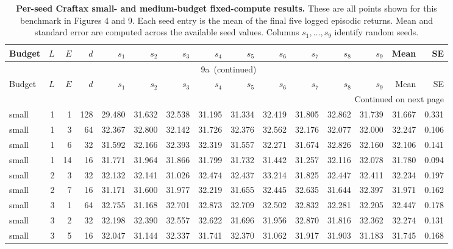 {\scriptsize
\setlength{\tabcolsep}{1.2pt}
\renewcommand{\thetable}{9a}
\begin{longtable}{@{}lrrrrrrrrrrrrrr@{}}
\caption{\textbf{Per-seed Craftax small- and medium-budget fixed-compute results.} These are all points shown for this benchmark in Figures 4 and 9. Each seed entry is the mean of the final five logged episodic returns. Mean and standard error are computed across the available seed values. Columns \(s_1,\ldots,s_9\) identify random seeds.}\label{tab:appendix-craftax-fixed-compute-seeds}\\
\toprule
Budget & \(L\) & \(E\) & \(d\) & \(s_1\) & \(s_2\) & \(s_3\) & \(s_4\) & \(s_5\) & \(s_6\) & \(s_7\) & \(s_8\) & \(s_9\) & Mean & SE \\
\midrule
\endfirsthead
\multicolumn{15}{c}{\tablename~\thetable\ (continued)} \\
\toprule
Budget & \(L\) & \(E\) & \(d\) & \(s_1\) & \(s_2\) & \(s_3\) & \(s_4\) & \(s_5\) & \(s_6\) & \(s_7\) & \(s_8\) & \(s_9\) & Mean & SE \\
\midrule
\endhead
\midrule
\multicolumn{15}{r}{Continued on next page} \\
\endfoot
\bottomrule
\endlastfoot
small & 1 & 1 & 128 & 29.480 & 31.632 & 32.538 & 31.195 & 31.334 & 32.419 & 31.805 & 32.862 & 31.739 & 31.667 & 0.331 \\
small & 1 & 3 & 64 & 32.367 & 32.800 & 32.142 & 31.726 & 32.376 & 32.562 & 32.176 & 32.077 & 32.000 & 32.247 & 0.106 \\
small & 1 & 6 & 32 & 31.592 & 32.166 & 32.393 & 32.319 & 31.557 & 32.271 & 31.674 & 32.826 & 32.160 & 32.106 & 0.141 \\
small & 1 & 14 & 16 & 31.771 & 31.964 & 31.866 & 31.799 & 31.732 & 31.442 & 31.257 & 32.116 & 32.078 & 31.780 & 0.094 \\
small & 2 & 3 & 32 & 32.132 & 32.141 & 31.026 & 32.474 & 32.437 & 33.214 & 31.825 & 32.447 & 32.411 & 32.234 & 0.197 \\
small & 2 & 7 & 16 & 31.171 & 31.600 & 31.977 & 32.219 & 31.655 & 32.445 & 32.635 & 31.644 & 32.397 & 31.971 & 0.162 \\
small & 3 & 1 & 64 & 32.755 & 31.168 & 32.701 & 32.873 & 32.709 & 32.502 & 32.832 & 32.281 & 32.205 & 32.447 & 0.178 \\
small & 3 & 2 & 32 & 32.198 & 32.390 & 32.557 & 32.622 & 31.696 & 31.956 & 32.870 & 31.816 & 32.362 & 32.274 & 0.131 \\
small & 3 & 5 & 16 & 32.047 & 31.144 & 32.337 & 31.741 & 32.370 & 31.062 & 31.917 & 31.903 & 31.183 & 31.745 & 0.168 \\

\end{longtable}}
